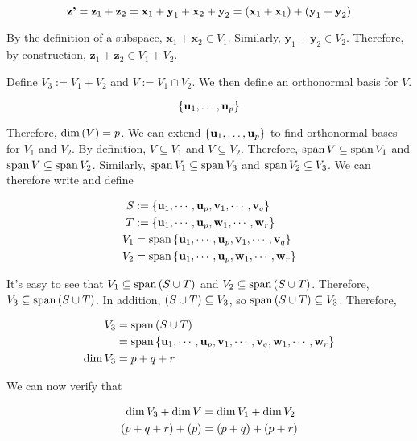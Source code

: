 \documentclass{article}
\begin{document}
$$
\textbf{z'} = \textbf{z}_1 + \textbf{z}_2 = \textbf{x}_1 + \textbf{y}_1 + \textbf{x}_2 + \textbf{y}_2 = \left ( \textbf{x}_1 + \textbf{x}_1 \right) + \left ( \textbf{y}_1 + \textbf{y}_2 \right)
$$

By the definition of a subspace, $\bm{x}_1 + \bm{x}_2 \in V_1$.
Similarly, $\bm{y}_1 + \bm{y}_2 \in V_2$.
Therefore, by construction, $\bm{z}_1 + \bm{z}_2 \in V_1 + V_2$.


Define $V_3 := V_1 + V_2$ and $V := V_1 \cap V_2$.
We then define an orthonormal basis for $V$.

$$
\left \{ \textbf{u}_1, \dots, \textbf{u}_p \right \}
$$

Therefore, $\dim \left ( V \right) = p$.
We can extend $\left \{ \textbf{u}_1, \dots, \textbf{u}_p \right \}$ to find orthonormal bases for $V_1$ and $V_2$.
By definition, $V \subseteq V_1$ and $V \subseteq V_2$.
Therefore, $\operatorname{span} V \subseteq \operatorname{span} V_1$ and $\operatorname{span} V \subseteq \operatorname{span} V_2$.
Similarly, $\operatorname{span} V_1 \subseteq \operatorname{span} V_3$ and $\operatorname{span} V_2 \subseteq V_3$.
We can therefore write and define

\begin{align*}
  S &:= \left \{ \textbf{u}_1, \cdots, \textbf{u}_p, \textbf{v}_1, \cdots, \textbf{v}_q \right \} \\
  T &:= \left \{ \textbf{u}_1, \cdots, \textbf{u}_p, \textbf{w}_1, \cdots, \textbf{w}_r \right \} \\
  V_1 &= \operatorname{span} \left \{ \textbf{u}_1, \cdots, \textbf{u}_p, \textbf{v}_1, \cdots, \textbf{v}_q \right \} \\
  V_2 &= \operatorname{span} \left \{ \textbf{u}_1, \cdots, \textbf{u}_p, \textbf{w}_1, \cdots, \textbf{w}_r \right \} \\
\end{align*}

It's easy to see that $V_1 \subseteq \operatorname{span} \left ( S \cup T \right)$ and $V_2 \subseteq \operatorname{span} \left ( S \cup T \right)$.
Therefore, $V_3 \subseteq \operatorname{span} \left ( S \cup T \right) $.
In addition, $\left ( S \cup T \right) \subseteq V_3$, so $\operatorname{span} \left ( S \cup T \right) \subseteq V_3$.
Therefore,

\begin{align*}
  V_3 &= \operatorname{span} \left ( S \cup T \right) \\
      &= \operatorname{span} \left \{ \textbf{u}_1, \cdots, \textbf{u}_p, \textbf{v}_1, \cdots, \textbf{v}_q, \textbf{w}_1, \cdots, \textbf{w}_r \right \} \\
  \dim V_3 &= p+q+r \\
\end{align*}

We can now verify that

\begin{align*}
  \dim V_3 + \dim V &= \dim V_1 + \dim V_2 \\
  \left ( p + q + r \right) + \left ( p \right) &= \left ( p+q \right) + \left ( p+r \right) \\
\end{align*}
\end{document}
